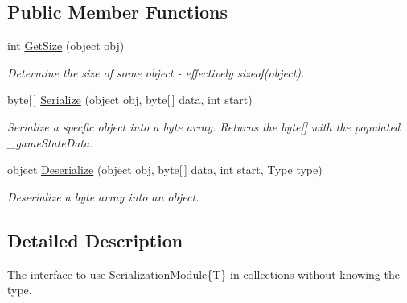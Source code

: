 \subsection*{Public Member Functions}
\begin{DoxyCompactItemize}
\item 
int \hyperlink{interface_skyrates_1_1_util_1_1_serializing_1_1_bit_serialize_attribute_1_1_i_serialization_module_aa1b15bcdfbdbf7422513276ffcf3d272}{Get\-Size} (object obj)
\begin{DoxyCompactList}\small\item\em Determine the size of some object -\/ effectively sizeof(object). \end{DoxyCompactList}\item 
byte\mbox{[}$\,$\mbox{]} \hyperlink{interface_skyrates_1_1_util_1_1_serializing_1_1_bit_serialize_attribute_1_1_i_serialization_module_a193efb5678e7782fb5de5c2f7c9116da}{Serialize} (object obj, byte\mbox{[}$\,$\mbox{]} data, int start)
\begin{DoxyCompactList}\small\item\em Serialize a specfic object into a byte array. Returns the byte\mbox{[}\mbox{]} with the populated \-\_\-game\-State\-Data. \end{DoxyCompactList}\item 
object \hyperlink{interface_skyrates_1_1_util_1_1_serializing_1_1_bit_serialize_attribute_1_1_i_serialization_module_a2b4853418bbc8b3ab6be091d674d282e}{Deserialize} (object obj, byte\mbox{[}$\,$\mbox{]} data, int start, Type type)
\begin{DoxyCompactList}\small\item\em Deserialize a byte array into an object. \end{DoxyCompactList}\end{DoxyCompactItemize}


\subsection{Detailed Description}
The interface to use Serialization\-Module\{\-T\} in collections without knowing the type. 



